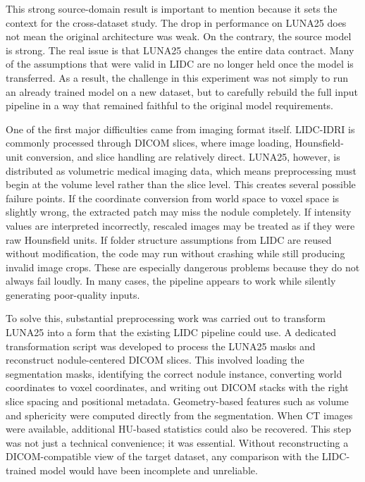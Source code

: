 \documentclass[10pt,letterpaper,twocolumn]{article}
\begin{document}
This strong source-domain result is important to mention because it sets the context for the cross-dataset study. The drop in performance on LUNA25 does not mean the original architecture was weak. On the contrary, the source model is strong. The real issue is that LUNA25 changes the entire data contract. Many of the assumptions that were valid in LIDC are no longer held once the model is transferred. As a result, the challenge in this experiment was not simply to run an already trained model on a new dataset, but to carefully rebuild the full input pipeline in a way that remained faithful to the original model requirements.

One of the first major difficulties came from imaging format itself. LIDC-IDRI is commonly processed through DICOM slices, where image loading, Hounsfield-unit conversion, and slice handling are relatively direct. LUNA25, however, is distributed as volumetric medical imaging data, which means preprocessing must begin at the volume level rather than the slice level. This creates several possible failure points. If the coordinate conversion from world space to voxel space is slightly wrong, the extracted patch may miss the nodule completely. If intensity values are interpreted incorrectly, rescaled images may be treated as if they were raw Hounsfield units. If folder structure assumptions from LIDC are reused without modification, the code may run without crashing while still producing invalid image crops. These are especially dangerous problems because they do not always fail loudly. In many cases, the pipeline appears to work while silently generating poor-quality inputs.

To solve this, substantial preprocessing work was carried out to transform LUNA25 into a form that the existing LIDC pipeline could use. A dedicated transformation script was developed to process the LUNA25 masks and reconstruct nodule-centered DICOM slices. This involved loading the segmentation masks, identifying the correct nodule instance, converting world coordinates to voxel coordinates, and writing out DICOM stacks with the right slice spacing and positional metadata. Geometry-based features such as volume and sphericity were computed directly from the segmentation. When CT images were available, additional HU-based statistics could also be recovered. This step was not just a technical convenience; it was essential. Without reconstructing a DICOM-compatible view of the target dataset, any comparison with the LIDC-trained model would have been incomplete and unreliable.
\end{document}

